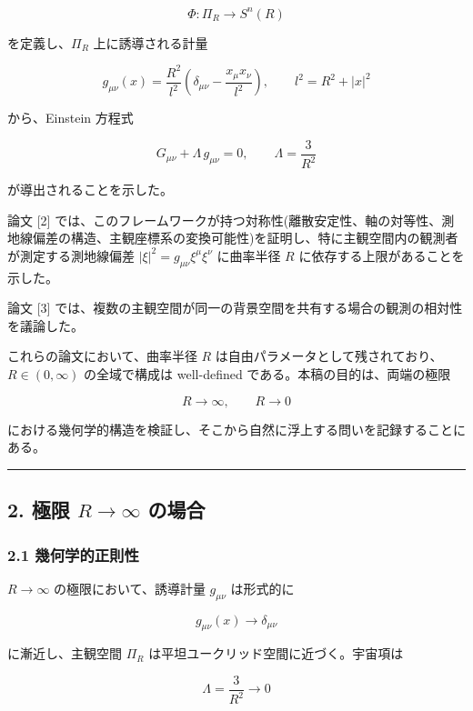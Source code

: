 \documentclass[a4paper,11pt]{ltjsarticle}
\theoremstyle{definition}
\begin{document}
\[
\Phi : \Pi_R \longrightarrow S^n(R)
\]

を定義し、\(\Pi_R\) 上に誘導される計量

\[
g_{\mu\nu}(x) = \frac{R^2}{l^2}\left(\delta_{\mu\nu} - \frac{x_\mu x_\nu}{l^2}\right), \qquad l^2 = R^2 + |x|^2
\]

から、Einstein 方程式

\[
G_{\mu\nu} + \Lambda\, g_{\mu\nu} = 0, \qquad \Lambda = \frac{3}{R^2}
\]

が導出されることを示した。

論文 {[}2{]} では、このフレームワークが持つ対称性(離散安定性、軸の対等性、測地線偏差の構造、主観座標系の変換可能性)を証明し、特に主観空間内の観測者が測定する測地線偏差 \(|\xi|^2 = g_{\mu\nu}\xi^\mu \xi^\nu\) に曲率半径 \(R\) に依存する上限があることを示した。

論文 {[}3{]} では、複数の主観空間が同一の背景空間を共有する場合の観測の相対性を議論した。

これらの論文において、曲率半径 \(R\) は自由パラメータとして残されており、\(R \in (0,\infty)\) の全域で構成は well-defined である。本稿の目的は、両端の極限

\[
R \to \infty, \qquad R \to 0
\]

における幾何学的構造を検証し、そこから自然に浮上する問いを記録することにある。

\begin{center}\rule{0.5\linewidth}{0.5pt}\end{center}

\subsection{\texorpdfstring{2. 極限 \(R \to \infty\) の場合}{2. 極限 R \textbackslash to \textbackslash infty の場合}}\label{ux6975ux9650-r-to-infty-ux306eux5834ux5408}

\subsubsection{2.1 幾何学的正則性}\label{ux5e7eux4f55ux5b66ux7684ux6b63ux5247ux6027}

\(R \to \infty\) の極限において、誘導計量 \(g_{\mu\nu}\) は形式的に

\[
g_{\mu\nu}(x) \longrightarrow \delta_{\mu\nu}
\]

に漸近し、主観空間 \(\Pi_R\) は平坦ユークリッド空間に近づく。宇宙項は

\[
\Lambda = \frac{3}{R^2} \longrightarrow 0
\]
\end{document}
